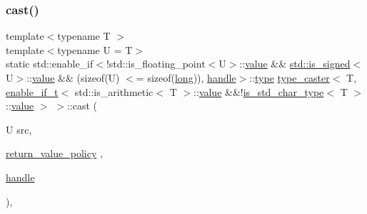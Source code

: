 \mbox{\label{structtype__caster_3_01_t_00_01enable__if__t_3_01std_1_1is__arithmetic_3_01_t_01_4_1_1value_01_624f9972c532456d927e4470192416960_a3f5f3737a1b6c451ca5dc3477d1c1d3b}} 
\subsubsection{\texorpdfstring{cast()}{cast()}\hspace{0.1cm}{\footnotesize\ttfamily [2/5]}}
{\footnotesize\ttfamily template$<$typename T $>$ \\
template$<$typename U  = T$>$ \\
static std\+::enable\+\_\+if$<$!std\+::is\+\_\+floating\+\_\+point$<$U$>$\+::\mbox{\hyperlink{_s_d_l__opengl__glext_8h_a8ad81492d410ff2ac11f754f4042150f}{value}} \&\& \mbox{\hyperlink{longobject_8h_ad9d9c8fff108a941e143d34a86eb36a2}{std\+::is\+\_\+signed}}$<$U$>$\+::\mbox{\hyperlink{_s_d_l__opengl__glext_8h_a8ad81492d410ff2ac11f754f4042150f}{value}} \&\& (sizeof(U) $<$= sizeof(\mbox{\hyperlink{modsupport_8h_a0cb68e00fb9fb1260ee2daadd9fe6611}{long}})), \mbox{\hyperlink{classhandle}{handle}}$>$\+::\mbox{\hyperlink{_s_d_l__opengl_8h_ad5ddf6fca7b585646515660e810e0188}{type}} \mbox{\hyperlink{classtype__caster}{type\+\_\+caster}}$<$ T, \mbox{\hyperlink{detail_2common_8h_a012819c9e8b5e04872a271f50f8b8196}{enable\+\_\+if\+\_\+t}}$<$ std\+::is\+\_\+arithmetic$<$ T $>$\+::\mbox{\hyperlink{_s_d_l__opengl__glext_8h_a8ad81492d410ff2ac11f754f4042150f}{value}} \&\&!\mbox{\hyperlink{cast_8h_a0ee0eaf3d12f9b0e472ed620777ba3c3}{is\+\_\+std\+\_\+char\+\_\+type}}$<$ T $>$\+::\mbox{\hyperlink{_s_d_l__opengl__glext_8h_a8ad81492d410ff2ac11f754f4042150f}{value}} $>$ $>$\+::cast (\begin{DoxyParamCaption}\item[{U}]{src,  }\item[{\mbox{\hyperlink{detail_2common_8h_adde72ab1fb0dd4b48a5232c349a53841}{return\+\_\+value\+\_\+policy}}}]{,  }\item[{\mbox{\hyperlink{classhandle}{handle}}}]{ }\end{DoxyParamCaption})\hspace{0.3cm}{\ttfamily [inline]}, {\ttfamily [static]}}

